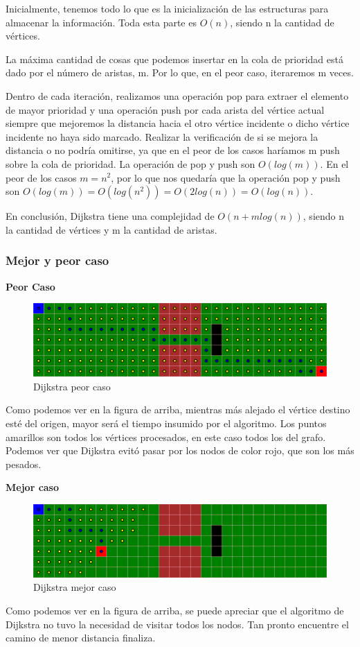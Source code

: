 Inicialmente, tenemos todo lo que es la inicialización de las estructuras para almacenar la información. Toda esta parte es $O(n)$, siendo n la cantidad de vértices.

La máxima cantidad de cosas que podemos insertar en la cola de prioridad está dado por el número de aristas, m. Por lo que, en el peor caso, iteraremos m veces.

Dentro de cada iteración, realizamos una operación pop para extraer el elemento de mayor prioridad y una operación push por cada arista del vértice actual siempre que mejoremos la distancia hacia el otro vértice incidente o dicho vértice incidente no haya sido marcado. Realizar la verificación de si se mejora la distancia o no podría omitirse, ya que en el peor de los casos haríamos m push sobre la cola de prioridad.
La operación de pop y push son $O(log(m))$. En el peor de los casos $m = n^2$, por lo que nos quedaría que la operación pop y push son $O(log(m)) = O(log(n^2)) = O(2log(n)) = O(log(n))$.

En conclusión, Dijkstra tiene una complejidad de $O(n + mlog(n))$, siendo n la cantidad de vértices y m la cantidad de aristas.

\subsubsection{Mejor y peor caso}
\textbf{Peor Caso}
\begin{figure}[H]
\centering
\includegraphics[width=\textwidth]{Dijkstra/dijkstra1Result.png}
\caption{Dijkstra peor caso}
\end{figure}

Como podemos ver en la figura de arriba, mientras más alejado el vértice destino esté del origen, mayor será el tiempo insumido por el algoritmo. Los puntos amarillos son todos los vértices procesados, en este caso todos los del grafo. Podemos ver que Dijkstra evitó pasar por los nodos de color rojo, que son los más pesados.

\textbf{Mejor caso}
\begin{figure}[H]
\centering
\includegraphics[width=\textwidth]{Dijkstra/dijkstra2Result.png}
\caption{Dijkstra mejor caso}
\end{figure}
Como podemos ver en la figura de arriba, se puede apreciar que el algoritmo de Dijkstra no tuvo la necesidad de visitar todos los nodos. Tan pronto encuentre el camino de menor distancia finaliza.


